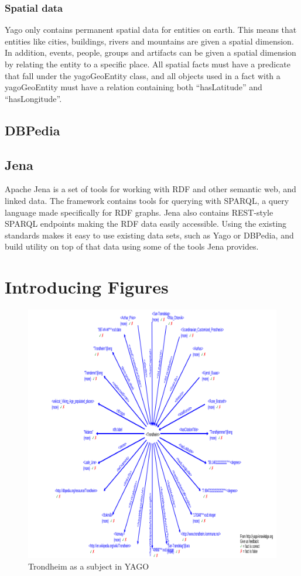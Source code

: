 \subsubsection{Spatial data}
Yago only contains permanent spatial data for entities on earth. This means that entities like cities, buildings, rivers and mountains are given a spatial dimension. In addition, events, people, groups and artifacts can be given a spatial dimension by relating the entity to a specific place. All spatial facts must have a predicate that fall under the yagoGeoEntity class, and all objects used in a fact with a yagoGeoEntity must have a relation containing both ``hasLatitude'' and ``hasLongitude''.

\subsection{DBPedia}

\subsection{Jena}
Apache Jena is a set of tools for working with RDF and other semantic web, and linked data. The framework contains tools for querying with SPARQL, a query language made specifically for RDF graphs. Jena also contains REST-style SPARQL endpoints making the RDF data easily accessible. Using the existing standards makes it easy to use existing data sets, such as Yago or DBPedia, and build utility on top of that data using some of the tools Jena provides.


\section{Introducing Figures}
\begin{figure}[t]
  \centering
  \includegraphics[scale=0.3]{figs/yago_trondheim.png}
 \caption{Trondheim as a subject in YAGO}
 \label{fig:Trondheim}
\end{figure}

